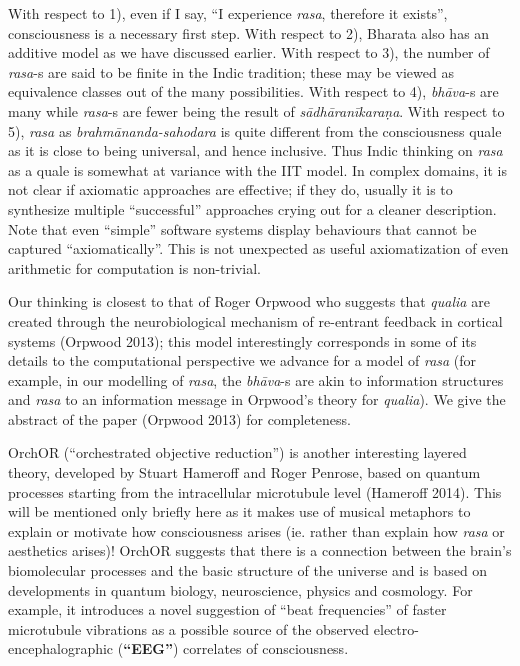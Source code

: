 With respect to 1), even if I say, “I experience \textsl{rasa}, therefore it exists”, consciousness is a necessary first step. With respect to 2), Bharata also has an additive model as we have discussed earlier. With respect to 3), the number of \textsl{rasa}-s are said to be finite in the Indic tradition; these may be viewed as equivalence classes out of the many possibilities. With respect to 4), \textsl{bhāva}-s are many while \textsl{rasa}-s are fewer being the result of \textsl{sādhāranīkaraṇa}. With respect to 5), \textsl{rasa} as  \textsl{brahmānanda-sahodara} is quite different from the consciousness quale as it is close to being universal, and hence inclusive. Thus Indic thinking on \textsl{rasa} as a quale is somewhat at variance with the IIT model. In complex domains, it is not clear if axiomatic approaches are effective; if they do, usually it is to synthesize multiple “successful” approaches crying out for a cleaner description. Note that even “simple” software systems display behaviours that cannot be captured “axiomatically”. This is not unexpected as useful axiomatization of even arithmetic for computation is non-trivial.

Our thinking is closest to that of Roger Orpwood who suggests that \textsl{qualia} are created through the neurobiological mechanism of re-entrant feedback in cortical systems (Orpwood 2013); this model interestingly corresponds in some of its details to the computational perspective we advance for a model of \textsl{rasa} (for example, in our modelling of \textsl{rasa}, the \textsl{bhāva}-s are akin to information structures and \textsl{rasa} to an information message in Orpwood’s theory for \textsl{qualia}). We give the abstract of the paper (Orpwood 2013) for completeness.


OrchOR (“orchestrated objective reduction”) is another interesting layered theory, developed by Stuart Hameroff and Roger Penrose, based on quantum processes starting from the intracellular microtubule level (Hameroff 2014). This will be mentioned only briefly here as it makes use of musical metaphors to explain or motivate how consciousness arises (ie. rather than explain how \textsl{rasa} or aesthetics arises)! OrchOR suggests that there is a connection between the brain’s biomolecular processes and the basic structure of the universe and is based on developments in quantum biology, neuroscience, physics and cosmology. For example, it introduces a novel suggestion of “beat frequencies” of faster microtubule vibrations as a possible source of the observed electro-encephalographic (\textbf{“EEG”}) correlates of consciousness.\\[-20pt]

